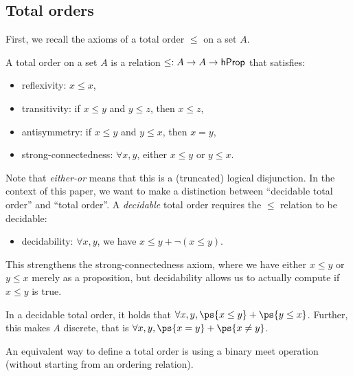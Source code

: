 
\subsection{Total orders}
\label{sec:total-orders}

First, we recall the axioms of a total order $\leq$ on a set $A$.
\begin{definition}
    \label{def:total-order}
    A total order on a set $A$ is a relation $\leq : A \to A \to \mathsf{hProp}$ that satisfies:
    \begin{itemize}
        \item reflexivity: $x \leq x$,
        \item transitivity: if $x \leq y$ and $y \leq z$, then $x \leq z$,
        \item antisymmetry: if $x \leq y$ and $y \leq x$, then $x = y$,
        \item strong-connectedness: $\forall x, y$, either $x \leq y$ or $y \leq x$.
    \end{itemize}
    Note that \emph{either-or} means that this is a (truncated) logical disjunction.
    In the context of this paper, we want to make a distinction between ``decidable total order''
    and ``total order''. A \emph{decidable} total order requires the $\leq$ relation to be decidable:
    \begin{itemize}
        \item decidability: $\forall x, y$, we have $x \leq y + \neg(x \leq y)$.
    \end{itemize}
\end{definition}
This strengthens the strong-connectedness axiom,
where we have either $x \leq y$ or $y \leq x$ merely as a proposition,
but decidability allows us to actually compute if $x \leq y$ is true.
\begin{proposition}
    \label{prop:decidable-total-order}
    In a decidable total order, it holds that ${\forall x, y}, \ps{x \leq y} + \ps{y \leq x}$.
    Further, this makes $A$ discrete, that is ${\forall x, y}, \ps{x \id y} + \ps{x \neq y}$.
\end{proposition}
%
\noindent
An equivalent way to define a total order is using a binary meet operation (without starting from an ordering relation).
